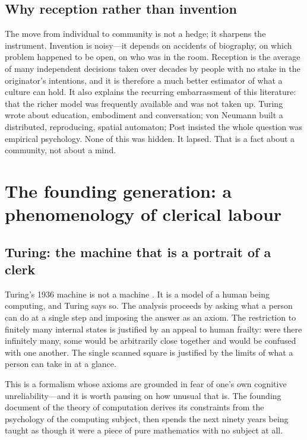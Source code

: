 \documentclass[11pt,a4paper]{article}
\begin{document}
\subsection{Why reception rather than invention}

The move from individual to community is not a hedge; it sharpens the
instrument. Invention is noisy---it depends on accidents of biography, on which
problem happened to be open, on who was in the room. Reception is the average of
many independent decisions taken over decades by people with no stake in the
originator's intentions, and it is therefore a much better estimator of what a
culture can hold. It also explains the recurring embarrassment of this literature:
that the richer model was frequently available and was not taken up. Turing wrote
about education, embodiment and conversation; von Neumann built a distributed,
reproducing, spatial automaton; Post insisted the whole question was empirical
psychology. None of this was hidden. It lapsed. That is a fact about a community,
not about a mind.

\section{The founding generation: a phenomenology of clerical labour}

\subsection{Turing: the machine that is a portrait of a clerk}
\label{sec:turing}

Turing's 1936 machine is not a machine \cite{turing1936}. It is a model of a human
being computing, and Turing says so. The analysis proceeds by asking what a person
can do at a single step and imposing the answer as an axiom. The restriction to
finitely many internal states is justified by an appeal to human frailty: were
there infinitely many, some would be arbitrarily close together and would be
confused with one another. The single scanned square is justified by the limits of
what a person can take in at a glance.

This is a formalism whose axioms are grounded in fear of one's own cognitive
unreliability---and it is worth pausing on how unusual that is. The founding
document of the theory of computation derives its constraints from the
psychology of the computing subject, then spends the next ninety years being
taught as though it were a piece of pure mathematics with no subject at all.
\end{document}
